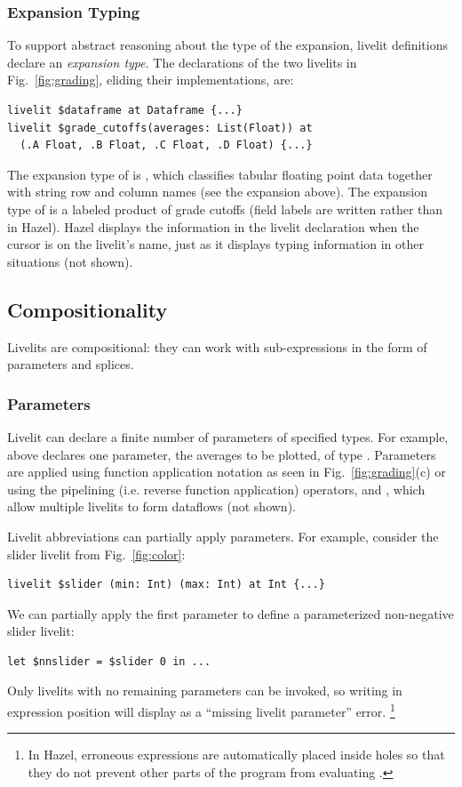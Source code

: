 \subsubsection{Expansion Typing} 
\label{sec:expansion-typing}
To support abstract reasoning about the type of the expansion,
livelit definitions declare an \emph{expansion type}.
The declarations of the two livelits in Fig.~\ref{fig:grading},
eliding their implementations, are:
\begin{lstlisting}[numbers=none,xleftmargin=0cm]
livelit $dataframe at Dataframe {...}
livelit $grade_cutoffs(averages: List(Float)) at 
  (.A Float, .B Float, .C Float, .D Float) {...}
\end{lstlisting}
The expansion type of  is ,
which classifies tabular floating point data together with string row and column names (see the expansion above).
The expansion type of  is a labeled product of grade cutoffs (field labels are written 
rather than  in Hazel).
Hazel displays the information in the livelit declaration when the cursor is on the livelit's name,
just as it displays typing information in other situations (not shown).

\subsection{Compositionality}\label{sec:splicing-and-parameterization}
Livelits are compositional: they can work with sub-expressions  
in the form of parameters and splices.

\subsubsection{Parameters}\label{sec:parameterization} 
Livelit can declare a finite number of parameters of specified types. 
For example,  above declares one parameter,
the averages to be plotted, of type .
Parameters are applied  
using function application notation 
as seen in Fig.~\ref{fig:grading}(c) or 
using the pipelining (i.e. reverse function application) operators, \li{<|} and \li{|>}, 
which allow multiple livelits to form dataflows (not shown).

Livelit abbreviations can partially apply parameters. For example, consider the slider livelit
from Fig.~\ref{fig:color}:
\begin{lstlisting}[numbers=none,xleftmargin=0cm]
livelit $slider (min: Int) (max: Int) at Int {...}
\end{lstlisting}
We can partially apply the first parameter to define a parameterized non-negative slider livelit:
\begin{lstlisting}[numbers=none,xleftmargin=0cm]
let $nnslider = $slider 0 in ...
\end{lstlisting}
Only livelits with no remaining parameters can be invoked, 
so writing  in expression position will display as a ``missing livelit parameter'' error.%
\footnote{\label{footnote:typing}In Hazel, erroneous expressions 
are automatically placed inside holes so that they do not prevent other parts of the program from evaluating
\cite{HazelnutLive}.}


